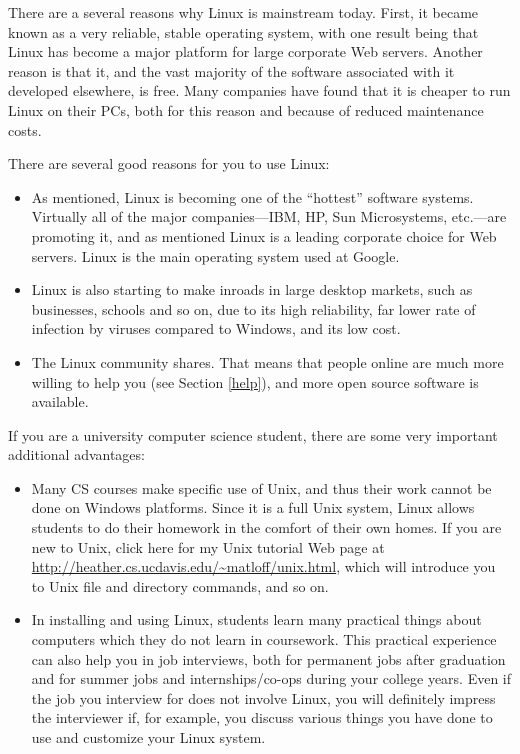 \documentclass[11pt]{article}
\begin{document}
There are a several reasons why Linux is mainstream today.  First, it
became known as a very reliable, stable operating system, with one
result being that Linux has become a major platform for large corporate
Web servers.  Another reason is that it, and the vast majority of the
software associated with it developed elsewhere, is free.  Many
companies have found that it is cheaper to run Linux on their PCs, both
for this reason and because of reduced maintenance costs.

There are several good reasons for you to use Linux:

\begin{itemize}

\item As mentioned, Linux is becoming one of the ``hottest'' software
systems. Virtually all of the major companies---IBM, HP, Sun
Microsystems, etc.---are promoting it, and as mentioned Linux is a
leading corporate choice for Web servers.  Linux is the main operating
system used at Google.

\item Linux is also starting to make inroads in large desktop markets,
such as businesses, schools and so on, due to its high reliability, far
lower rate of infection by viruses compared to Windows, and its low
cost.

\item The Linux community shares.  That means that people online are
much more willing to help you (see Section \ref{help}), and more open
source software is available.

\end{itemize}

If you are a university computer science student, there are some very
important additional advantages: 

\begin{itemize}

\item Many CS courses make specific use of Unix, and thus their work
cannot be done on Windows platforms. Since it is a full Unix system,
Linux allows students to do their homework in the comfort of their own
homes. If you are new to Unix, click here for my Unix tutorial Web page
at \url{http://heather.cs.ucdavis.edu/~matloff/unix.html}, which will
introduce you to Unix file and directory commands, and so on.

\item In installing and using Linux, students learn many practical
things about computers which they do not learn in coursework. This
practical experience can also help you in job interviews, both for
permanent jobs after graduation and for summer jobs and
internships/co-ops during your college years. Even if the job you
interview for does not involve Linux, you will definitely impress the
interviewer if, for example, you discuss various things you have done to
use and customize your Linux system.

\end{itemize}
\end{document}
